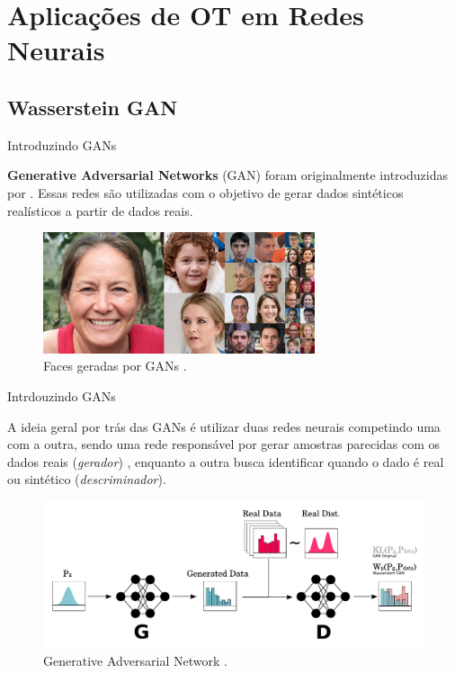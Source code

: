 \documentclass[10pt]{beamer}
\begin{document}
\AtBeginSection{}
\section[Aplicações OT]{Aplicações de OT em Redes Neurais}
\subsection[WGAN]{Wasserstein GAN}
\begin{frame}[fragile]{Introduzindo GANs}

	\textbf{Generative Adversarial Networks} (GAN)
	foram originalmente introduzidas por \citet{goodfellow2014}.
	Essas redes são utilizadas com o objetivo de gerar
	dados sintéticos realísticos a partir de dados reais.

	\begin{figure}[H]
		\centering
		\includegraphics[width=8cm]{Figures/gans-faces.png}
		\caption{Faces geradas por GANs \citep{karras2018}.}
	\end{figure}

\end{frame}

\begin{frame}[fragile]{Intrdouzindo GANs}

	A ideia geral por trás das GANs é utilizar duas redes neurais
	competindo uma com a outra, sendo uma rede responsável por
	gerar amostras parecidas com os dados reais (\textit{gerador}) , enquanto a outra
	busca identificar quando o dado é real ou sintético
	(\textit{descriminador}).

	\begin{figure}[H]
		\begin{center}
			\includegraphics[width=1.0\textwidth]{Figures/wgan.pdf}
		\end{center}
		\caption{Generative Adversarial Network \citep{sales2021optimal}.}
	\end{figure}

\end{frame}
\end{document}
